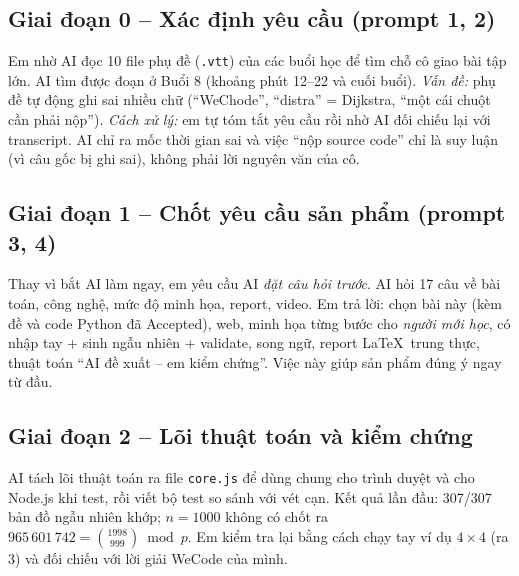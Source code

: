 \documentclass[12pt,a4paper]{report}
\begin{document}
\subsection*{Giai đoạn 0 -- Xác định yêu cầu (prompt 1, 2)}
Em nhờ AI đọc 10 file phụ đề (\texttt{.vtt}) của các buổi học để tìm chỗ cô giao bài tập lớn. AI tìm được đoạn ở Buổi 8 (khoảng phút 12--22 và cuối buổi). \emph{Vấn đề:} phụ đề tự động ghi sai nhiều chữ (``WeChode'', ``distra'' = Dijkstra, ``một cái chuột cần phải nộp''). \emph{Cách xử lý:} em tự tóm tắt yêu cầu rồi nhờ AI đối chiếu lại với transcript. AI chỉ ra mốc thời gian sai và việc ``nộp source code'' chỉ là suy luận (vì câu gốc bị ghi sai), không phải lời nguyên văn của cô.

\subsection*{Giai đoạn 1 -- Chốt yêu cầu sản phẩm (prompt 3, 4)}
Thay vì bắt AI làm ngay, em yêu cầu AI \emph{đặt câu hỏi trước}. AI hỏi 17 câu về bài toán, công nghệ, mức độ minh họa, report, video. Em trả lời: chọn bài này (kèm đề và code Python đã Accepted), web, minh họa từng bước cho \emph{người mới học}, có nhập tay + sinh ngẫu nhiên + validate, song ngữ, report \LaTeX\ trung thực, thuật toán ``AI đề xuất -- em kiểm chứng''. Việc này giúp sản phẩm đúng ý ngay từ đầu.

\subsection*{Giai đoạn 2 -- Lõi thuật toán và kiểm chứng}
AI tách lõi thuật toán ra file \texttt{core.js} để dùng chung cho trình duyệt và cho Node.js khi test, rồi viết bộ test so sánh với vét cạn. Kết quả lần đầu: 307/307 bản đồ ngẫu nhiên khớp; $n=1000$ không có chốt ra $965\,601\,742 = \binom{1998}{999}\bmod p$. Em kiểm tra lại bằng cách chạy tay ví dụ $4\times4$ (ra 3) và đối chiếu với lời giải WeCode của mình.
\end{document}
